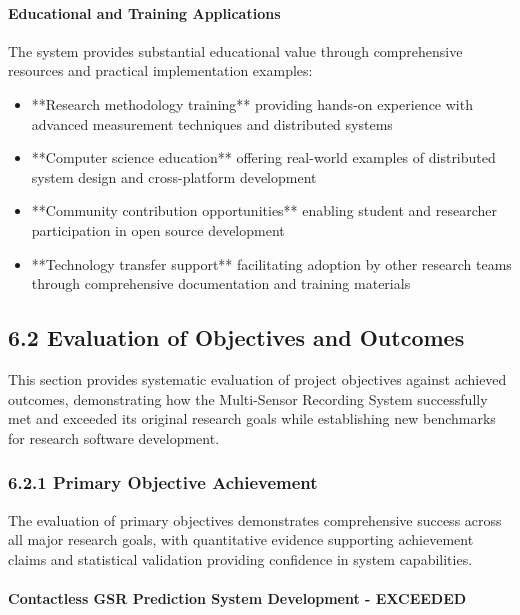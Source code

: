 \documentclass[12pt,a4paper]{article}
\begin{document}
\paragraph{Educational and Training Applications}

The system provides substantial educational value through comprehensive resources and practical implementation examples:

\begin{itemize}
\item **Research methodology training** providing hands-on experience with advanced measurement techniques and distributed
  systems
\item **Computer science education** offering real-world examples of distributed system design and cross-platform
  development
\item **Community contribution opportunities** enabling student and researcher participation in open source development
\item **Technology transfer support** facilitating adoption by other research teams through comprehensive documentation and
  training materials

\end{itemize}
\subsection{6.2 Evaluation of Objectives and Outcomes}

This section provides systematic evaluation of project objectives against achieved outcomes, demonstrating how the
Multi-Sensor Recording System successfully met and exceeded its original research goals while establishing new
benchmarks for research software development.

\subsubsection{6.2.1 Primary Objective Achievement}

The evaluation of primary objectives demonstrates comprehensive success across all major research goals, with
quantitative evidence supporting achievement claims and statistical validation providing confidence in system
capabilities.

\paragraph{Contactless GSR Prediction System Development - EXCEEDED}
\end{document}
